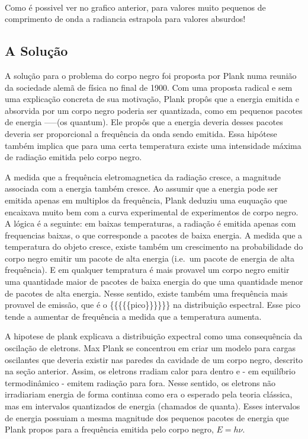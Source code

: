 \documentclass[11pt]{article}
\begin{document}
    \begin{center}
    \end{center}
    { \hspace*{\fill} \\}
    
    Como é possivel ver no grafico anterior, para valores muito pequenos de
comprimento de onda a radiancia estrapola para valores absurdos!

    \hypertarget{a-soluuxe7uxe3o}{%
\subsection{A Solução}\label{a-soluuxe7uxe3o}}

A solução para o problema do corpo negro foi proposta por Plank numa
reunião da sociedade alemã de física no final de 1900. Com uma proposta
radical e sem uma explicação concreta de sua motivação, Plank propôs que
a energia emitida e absorvida por um corpo negro poderia ser quantizada,
como em pequenos pacotes de energia -----(os quantum). Ele propôs que a
energia deveria desses pacotes deveria ser proporcional a frequência da
onda sendo emitida. Essa hipótese também implica que para uma certa
temperatura existe uma intensidade máxima de radiação emitida pelo corpo
negro.

A medida que a frequência eletromagnetica da radiação cresce, a
magnitude associada com a energia também cresce. Ao assumir que a
energia pode ser emitida apenas em multiplos da frequência, Plank
deduziu uma euquação que encaixava muito bem com a curva experimental de
experimentos de corpo negro. A lógica é a seguinte: em baixas
temperaturas, a radiação é emitida apenas com frequencias baixas, o que
corresponde a pacotes de baixa energia. A medida que a temperatura do
objeto cresce, existe também um crescimento na probabilidade do corpo
negro emitir um pacote de alta energia (i.e.~um pacote de energia de
alta frequência). E em qualquer tempratura é mais provavel um corpo
negro emitir uma quantidade maior de pacotes de baixa energia do que uma
quantidade menor de pacotes de alta energia. Nesse sentido, existe
também uma frequência mais provavel de emissão, que é o
\{\{\{\{\{pico\}\}\}\}\}\} na distribuição espectral. Esse pico tende a
aumentar de frequência a medida que a temperatura aumenta.

A hipotese de plank explicava a distribuição expectral como uma
consequência da oscilação de eletrons. Max Plank se concentrou em criar
um modelo para cargas oscilantes que deveria existir nas paredes da
cavidade de um corpo negro, descrito na seção anterior. Assim, os
eletrons rradiam calor para dentro e - em equilíbrio termodinâmico -
emitem radiação para fora. Nesse sentido, os eletrons não irradiariam
energia de forma continua como era o esperado pela teoria clássica, mas
em intervalos quantizados de energia (chamados de quanta). Esses
intervalos de energia possuiam a mesma magnitude dos pequenos pacotes de
energia que Plank propos para a frequência emitida pelo corpo negro,
\(E=h\nu\).
\end{document}
